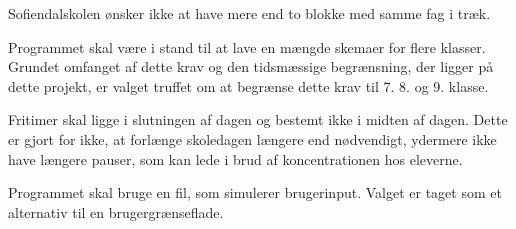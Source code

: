 Sofiendalskolen ønsker ikke at have mere end to blokke med samme fag i træk.

Programmet skal være i stand til at lave en mængde skemaer for flere klasser. Grundet omfanget af dette krav og den tidsmæssige begrænsning, der ligger på dette projekt, er valget truffet om at begrænse dette krav til 7. 8. og 9. klasse. 

Fritimer skal ligge i slutningen af dagen og bestemt ikke i midten af dagen. Dette er gjort for ikke, at forlænge skoledagen længere end nødvendigt, ydermere ikke have længere pauser, som kan lede i brud af koncentrationen hos eleverne.

Programmet skal bruge en fil, som simulerer brugerinput. Valget er taget som et alternativ til en brugergrænseflade.  

